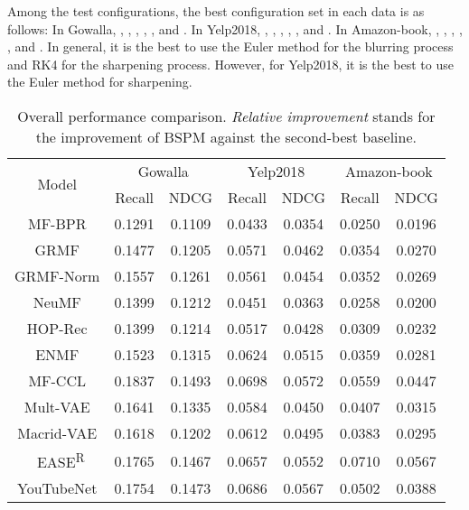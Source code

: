\documentclass[sigconf,natbib=true]{acmart}
\begin{document}
Among the test configurations, the best configuration set in each data is as follows: In Gowalla, , , , ,  , and . In Yelp2018, , , , , , and . In Amazon-book, , , , , , and . In general, it is the best to use the Euler method for the blurring process and RK4 for the sharpening process. However, for Yelp2018, it is the best to use the Euler method for sharpening.

\begin{table}[ht!]
    \small
    \setlength{\tabcolsep}{2pt}
    \centering
    \caption{Overall performance comparison. \textit{Relative improvement} stands for the improvement of BSPM against the second-best baseline.}
    \begin{tabular}{c cc cc cc}\toprule
        \multirow{2}{*}{Model}  & \multicolumn{2}{c}{Gowalla} & \multicolumn{2}{c}{Yelp2018} & \multicolumn{2}{c}{Amazon-book} \\ \cmidrule(lr){2-3}\cmidrule(lr){4-5}\cmidrule(lr){6-7}
                                & Recall & NDCG             & Recall & NDCG    & Recall & NDCG \\ \midrule
        MF-BPR                  & 0.1291 & 0.1109           & 0.0433 & 0.0354  & 0.0250 & 0.0196 \\
        GRMF                    & 0.1477 & 0.1205           & 0.0571 & 0.0462  & 0.0354 & 0.0270 \\
        GRMF-Norm               & 0.1557 & 0.1261           & 0.0561 & 0.0454  & 0.0352 & 0.0269 \\
        NeuMF                   & 0.1399 & 0.1212           & 0.0451 & 0.0363  & 0.0258 & 0.0200 \\
        HOP-Rec                 & 0.1399 & 0.1214           & 0.0517 & 0.0428  & 0.0309 & 0.0232 \\
        ENMF                    & 0.1523 & 0.1315           & 0.0624 & 0.0515  & 0.0359 & 0.0281 \\
        MF-CCL           & 0.1837 & 0.1493           & 0.0698 & 0.0572  & 0.0559 & 0.0447 \\\midrule
        Mult-VAE                & 0.1641 & 0.1335           & 0.0584 & 0.0450  & 0.0407 & 0.0315 \\
        Macrid-VAE              & 0.1618 & 0.1202           & 0.0612 & 0.0495  & 0.0383 & 0.0295 \\\
        EASE\textsuperscript{R}              & 0.1765	& 0.1467           & 0.0657	& 0.0552  & 0.0710 & 0.0567 \\\midrule
        YouTubeNet              & 0.1754 & 0.1473           & 0.0686 & 0.0567  & 0.0502 & 0.0388 \\

\end{tabular}
\end{table}
\end{document}

